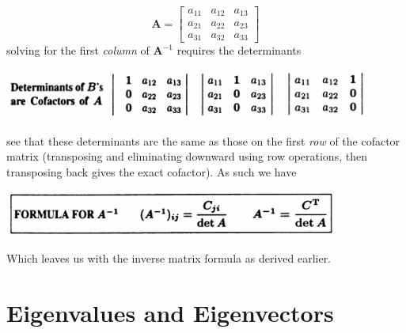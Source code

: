 \documentclass{report}
\begin{document}
\begin{equation*}
\bm A=\left[\begin{array}{ccc}
a_{11}&a_{12}&a_{13}\\
a_{21}&a_{22}&a_{23}\\
a_{31}&a_{32}&a_{33}
\end{array}\right]
\end{equation*}
solving for the first \textit{column} of $\bm A^{-1}$ requires the determinants
\begin{center}
\includegraphics[width=12cm]{108}
\end{center}
see that these determinants are the same as those on the first \textit{row} of the cofactor matrix 
(transposing and eliminating downward using row operations, then transposing back gives the exact cofactor). As such we have
\begin{center}
\includegraphics[width=11cm]{109}
\end{center}
Which leaves us with the inverse matrix formula as derived earlier.
\newpage

\chapter{Eigenvalues and Eigenvectors}
\end{document}
